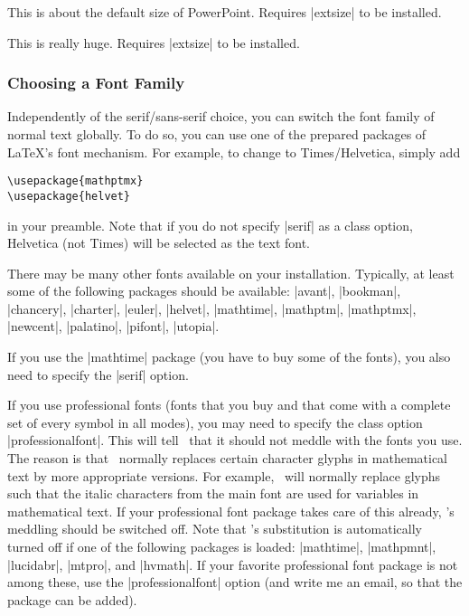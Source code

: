 \begin{classoption}{17pt}
  This is about the default size of PowerPoint. Requires |extsize| to
  be installed. 
\end{classoption}

\begin{classoption}{20pt}
  This is really huge. Requires |extsize| to be installed.
\end{classoption}



\subsubsection{Choosing a Font Family}

\label{section-substition}

Independently of the serif/sans-serif choice, you can switch the font
family of normal text globally. To do so, you can use one of the
prepared packages of \LaTeX's font mechanism. For example, to change
to Times/Helvetica, simply add 
\begin{verbatim}
\usepackage{mathptmx}
\usepackage{helvet}
\end{verbatim}
in your preamble. Note that if you do not specify |serif| as a
class option, Helvetica (not Times) will be selected as the text
font.

There may be many other fonts available on your
installation. Typically, at least some of the following packages
should be available: |avant|, |bookman|, |chancery|, |charter|,
|euler|, |helvet|, |mathtime|, |mathptm|, |mathptmx|, |newcent|,
|palatino|, |pifont|, |utopia|.

If you use the |mathtime| package (you have to buy some of the fonts),
you also need to specify the |serif| option.

If you use professional fonts (fonts that you buy and that come with a
complete set of every symbol in all modes), you may need to specify the
class option |professionalfont|. This will tell \beamer\ that it
should not meddle with the fonts you use. The reason is that \beamer\ 
normally replaces certain character glyphs in mathematical text by
more appropriate versions. For example, \beamer\ will normally replace
glyphs such that the italic characters from the main font are used for
variables in mathematical text. If your professional font package
takes care of this already, \beamer's meddling should be switched
off. Note that \beamer's substitution is automatically turned off if
one of the following packages is loaded: |mathtime|, |mathpmnt|,
|lucidabr|, |mtpro|, and |hvmath|. If your favorite professional font
package is not among these, use the |professionalfont| option (and
write me an email, so that the package can be added).


